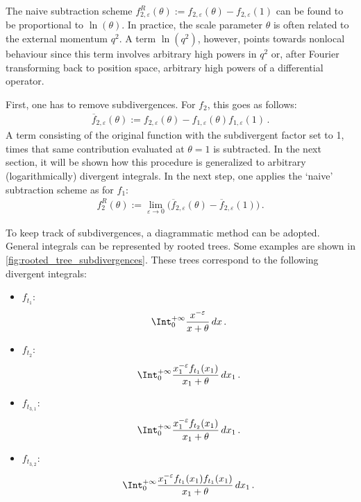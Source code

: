    \begin{remark}[Nonlocality]
        The naive subtraction scheme $f_{2,\varepsilon}^R(\theta) := f_{2,\varepsilon}(\theta) - f_{2,\varepsilon}(1)$ can be found to be proportional to $\ln(\theta)$. In practice, the scale parameter $\theta$ is often related to the external momentum $q^2$. A term $\ln(q^2)$, however, points towards nonlocal behaviour since this term involves arbitrary high powers in $q^2$ or, after Fourier transforming back to position space, arbitrary high powers of a differential operator.
    \end{remark}

    First, one has to remove subdivergences. For $f_2$, this goes as follows:
    \begin{gather}
        \overline{f}_{2,\varepsilon}(\theta) := f_{2,\varepsilon}(\theta) - f_{1,\varepsilon}(\theta)f_{1,\varepsilon}(1)\,.
    \end{gather}
    A term consisting of the original function with the subdivergent factor set to 1, times that same contribution evaluated at $\theta=1$ is subtracted. In the next section, it will be shown how this procedure is generalized to arbitrary (logarithmically) divergent integrals. In the next step, one applies the `naive' subtraction scheme as for $f_1$:
    \begin{gather}
        f_2^R(\theta) := \lim_{\varepsilon\rightarrow0}\bigl(\overline{f}_{2,\varepsilon}(\theta)-\overline{f}_{2,\varepsilon}(1)\bigr)\,.
    \end{gather}

    To keep track of subdivergences, a diagrammatic method can be adopted. General integrals can be represented by rooted trees. Some examples are shown in \cref{fig:rooted_tree_subdivergences}. These trees correspond to the following divergent integrals:
    \begin{itemize}
        \item $f_{t_1}$:
        \begin{gather}
            \Int_0^{+\infty}\frac{x^{-\varepsilon}}{x+\theta}\,dx\,.
        \end{gather}
        \item $f_{t_2}$:
        \begin{gather}
            \Int_0^{+\infty}\frac{x_1^{-\varepsilon}f_{t_1}(x_1)}{x_1+\theta}\,dx_1\,.
        \end{gather}
        \item $f_{t_{3,1}}$:
        \begin{gather}
            \Int_0^{+\infty}\frac{x_1^{-\varepsilon}f_{t_2}(x_1)}{x_1+\theta}\,dx_1\,.
        \end{gather}
        \item $f_{t_{3,2}}$:
        \begin{gather}
            \Int_0^{+\infty}\frac{x_1^{-\varepsilon}f_{t_1}(x_1)f_{t_1}(x_1)}{x_1+\theta}\,dx_1\,.
        \end{gather}
    \end{itemize}

